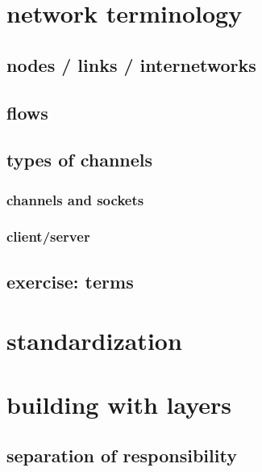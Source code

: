 
\section{network terminology}

\subsection{nodes / links / internetworks}



\subsection{flows}



\subsection{types of channels}



\subsubsection{channels and sockets}


\subsubsection{client/server}


\subsection{exercise: terms}


\section{standardization}


\section{building with layers}

\subsection{separation of responsibility}

